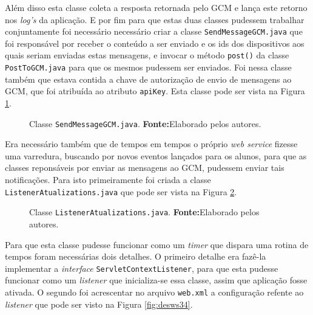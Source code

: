 	\pagebreak
	
	\par Além disso esta classe coleta a resposta retornada pelo GCM e lança este
retorno nos \textit{log's} da aplicação. E por fim para que estas duas classes
pudessem trabalhar conjuntamente foi necessário necessário criar a classe
\texttt{SendMessageGCM.java} que foi responsável por receber o conteúdo a ser
enviado e os ids dos dispositivos aos quais seriam enviadas estas mensagens, e
invocar o método \texttt{post()} da classe \texttt{PostToGCM.java} para que os
mesmos pudessem ser enviados. Foi nessa classe também que estava contida a
chave de autorização de envio de mensagens ao GCM, que foi atribuída ao
atributo \texttt{apiKey}. Esta classe pode ser vista na Figura
\ref{fig:desws32}.

	\begin{figure}[h!]
		
		\caption[Classe SendMessageGCM.java]{Classe \texttt{SendMessageGCM.java}.
		\textbf{Fonte:}Elaborado pelos autores.}
		\label{fig:desws32}
	\end{figure}
	
	\pagebreak		
	
	\par Era necessário também que  de tempos em tempos o próprio \textit{web
service} fizesse uma varredura, buscando por novos eventos lançados para os
alunos, para que as classes reponsáveis por enviar as mensagens ao GCM, pudessem
enviar tais notificações. Para isto primeiramente foi criada a classe
\texttt{ListenerAtualizations.java} que pode ser vista na Figura
\ref{fig:desws33}.

	\begin{figure}[h!]
		
		\caption[Classe ListenerAtualizations.java]{Classe
		\texttt{ListenerAtualizations.java}.
		\textbf{Fonte:}Elaborado pelos autores.}
		\label{fig:desws33}
	\end{figure}
	
	\par Para que esta classe pudesse funcionar como um \textit{timer} que
dispara uma rotina de tempos foram necessárias dois detalhes. O primeiro detalhe
era fazê-la implementar a \textit{interface} \texttt{ServletContextListener}, para
que esta pudesse funcionar como um \textit{listener} que inicializa-se essa
classe, assim que aplicação fosse ativada. O segundo foi acrescentar no arquivo
\texttt{web.xml} a configuração refente ao \textit{listener} que pode ser visto
na Figura \ref{fig:desws34}.

